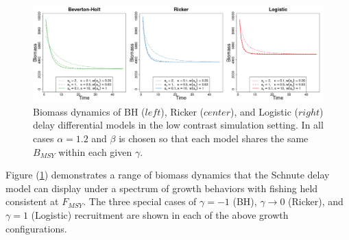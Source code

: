 %
\begin{figure}[h!]
\includegraphics[width=\textwidth]{../ddBias/growthTriptic.png}
\caption{
Biomass dynamics of BH ($left$), Ricker ($center$), and Logistic ($right$)
delay differential models in the low contrast simulation setting. In all cases
$\alpha=1.2$ and $\beta$ is chosen so that each model shares the same
$B_{MSY}$ within each given $\gamma$.
}\label{delayTriptic}
\end{figure}
%
Figure (\ref{delayTriptic}) demonstrates a range of biomass dynamics that the Schnute
delay model can display under a spectrum of growth behaviors with fishing held consistent
at $F_{MSY}$. The three special cases of $\gamma=-1$ (BH), $\gamma\to0$
(Ricker), and $\gamma=1$ (Logistic) recruitment are shown in each of the above growth configurations.

 

